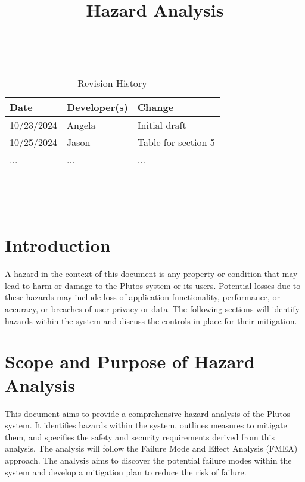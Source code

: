 \documentclass{article}
\title{Hazard Analysis\\\progname}
\author{\authname}
\date{}
\begin{document}
\maketitle
\thispagestyle{empty}

~\newpage


\begin{table}[hp]
\caption{Revision History} \label{TblRevisionHistory}
\begin{tabularx}{\textwidth}{llX}
\toprule
\textbf{Date} & \textbf{Developer(s)} & \textbf{Change}\\
\midrule
10/23/2024 & Angela & Initial draft\\
10/25/2024 & Jason & Table for section 5 \\
... & ... & ... \\
\bottomrule
\end{tabularx}
\end{table}

~\newpage

\tableofcontents

~\newpage


\section{Introduction}

A hazard in the context of this document is any property or condition that may
lead to harm or damage to the Plutos system or its users. Potential losses due
to these hazards may include loss of application functionality, performance, or
accuracy, or breaches of user privacy or data. The following sections will
identify hazards within the system and discuss the controls in place for their
mitigation.


\section{Scope and Purpose of Hazard Analysis}

This document aims to provide a comprehensive hazard analysis of the Plutos
system. It identifies hazards within the system, outlines measures to mitigate
them, and specifies the safety and security requirements derived from this
analysis. The analysis will follow the Failure Mode and Effect Analysis (FMEA)
approach. The analysis aims to discover the potential failure modes within the
system and develop a mitigation plan to reduce the risk of failure. 
\end{document}
